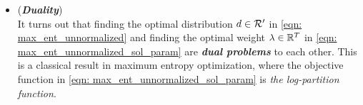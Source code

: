 \documentclass[11pt]{article}
\begin{document}
\begin{itemize}
\item \begin{remark}(\textbf{\emph{Duality}})\\
It turns out that finding the optimal distribution $d \in {\mathcal R}'$ in \eqref{eqn: max_ent_unnormalized}  and finding the optimal weight $\lambda \in {\mathbb R}^{T}$ in \eqref{eqn: max_ent_unnormalized_sol_param} are \emph{\textbf{dual problems}} to each other. This is a classical result in maximum entropy optimization, where the objective function in \eqref{eqn: max_ent_unnormalized_sol_param} is \emph{the log-partition function}.
\end{remark}
\end{itemize}


\newpage


\end{document}
